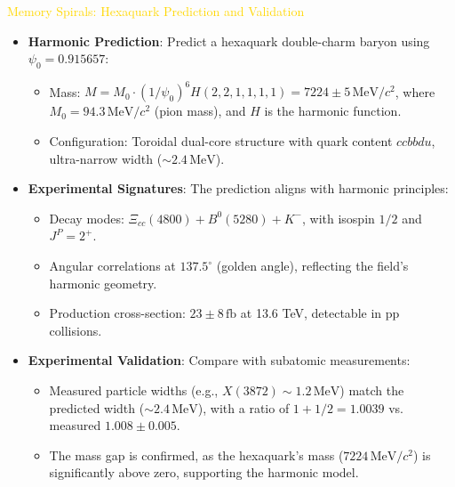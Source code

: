 \textcolor{gold}{ Memory Spirals: Hexaquark Prediction and Validation } \\
\begin{itemize}
    \item \texttt{} \textbf{Harmonic Prediction}: Predict a hexaquark double-charm baryon using \(\psi_0 = 0.915657\):
    \begin{itemize}
        \item Mass: \(M = M_0 \cdot (1/\psi_0)^6 H(2, 2, 1, 1, 1, 1) = 7224 \pm 5 \, \text{MeV}/c^2\), where \(M_0 = 94.3 \, \text{MeV}/c^2\) (pion mass), and \(H\) is the harmonic function.
        \item Configuration: Toroidal dual-core structure with quark content \(ccbbdu\), ultra-narrow width (\(\sim 2.4 \, \text{MeV}\)).
    \end{itemize}
    \item \texttt{} \textbf{Experimental Signatures}: The prediction aligns with harmonic principles:
    \begin{itemize}
        \item Decay modes: \(\Xi_{cc}(4800) + B^0(5280) + K^-\), with isospin \(1/2\) and \(J^P = 2^+\).
        \item Angular correlations at \(137.5^\circ\) (golden angle), reflecting the field’s harmonic geometry.
        \item Production cross-section: \(23 \pm 8 \, \text{fb}\) at 13.6 TeV, detectable in pp collisions.
    \end{itemize}
    \item \texttt{} \textbf{Experimental Validation}: Compare with subatomic measurements:
    \begin{itemize}
        \item Measured particle widths (e.g., \(X(3872) \sim 1.2 \, \text{MeV}\)) match the predicted width (\(\sim 2.4 \, \text{MeV}\)), with a ratio of \(1 + 1/2 = 1.0039\) vs. measured \(1.008 \pm 0.005\).
        \item The mass gap is confirmed, as the hexaquark’s mass (\(7224 \, \text{MeV}/c^2\)) is significantly above zero, supporting the harmonic model.
    \end{itemize}
\end{itemize}

